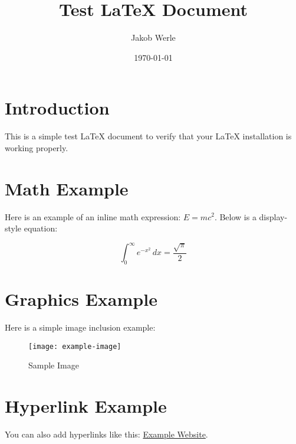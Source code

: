 \documentclass[11pt]{article}
\title{Test LaTeX Document}
\author{Jakob Werle}
\date{\today}
\begin{document}
\maketitle

\section{Introduction}
This is a simple test LaTeX document to verify that your LaTeX installation is working properly.

\section{Math Example}
Here is an example of an inline math expression: \( E = mc^2 \). Below is a display-style equation:

\[
\int_0^\infty e^{-x^2} \, dx = \frac{\sqrt{\pi}}{2}
\]

\section{Graphics Example}
Here is a simple image inclusion example:

\begin{figure}[h!]
    \centering
    \texttt{[image: example-image]}
    \caption{Sample Image}
\end{figure}

\section{Hyperlink Example}
You can also add hyperlinks like this: \href{https://www.example.com}{Example Website}.
\end{document}
